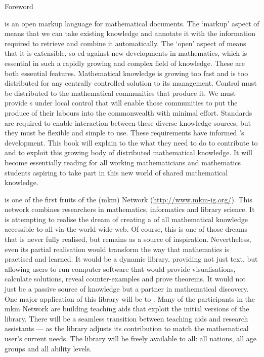 \begin{omgroup}{Foreword}
\begin{omtext}
{\omdoc} is an open markup language for mathematical documents. The `markup' aspect of
{\omdoc} means that we can take existing knowledge and annotate it with the information
required to retrieve and combine it automatically. The `open' aspect of {\omdoc} means
that it is extensible, so {ed} against new developments in
mathematics, which is essential in such a rapidly growing and complex field of
knowledge. These are both essential features. Mathematical knowledge is growing too fast
and is too distributed for any centrally controlled solution to its management. Control
must be distributed to the mathematical communities that produce it. We must provide
{s} under local control that will enable those communities
to put the produce of their labours into the commonwealth with minimal effort. Standards
are required to enable interaction between these diverse knowledge sources, but they must
be flexible and simple to use. These requirements have informed {\omdoc}'s
development. This book will explain to the
{} what they need to do to contribute to
and to exploit this growing body of distributed mathematical knowledge. It will become
essentially reading for all working mathematicians and mathematics students aspiring to
take part in this new world of shared mathematical knowledge.
\end{omtext}

\begin{omtext}
{\omdoc} is one of the first fruits of the {}
({\sc mkm}) Network (\url{http://www.mkm-ig.org/}). This network combines researchers in
mathematics, informatics and library science. It is attempting to realise the dream of
creating a {} of all mathematical
knowledge accessible to all via the world-wide-web. Of course, this is one of those dreams
that is never fully realised, but remains as a source of inspiration. Nevertheless, even
its partial realisation would transform the way that mathematics is practised and
learned. It would be a dynamic library, providing not just text, but allowing users to run
computer software that would provide visualisations, calculate solutions, reveal
counter-examples and prove theorems. It would not just be a passive source of knowledge
but a partner in mathematical discovery. One major application of this library will be to
{}. Many of the participants in the {\sc mkm} Network are building
teaching aids that exploit the initial versions of the library. There will be a seamless
transition between teaching aids and research assistants --- as the library adjusts its
contribution to match the mathematical user's current needs. The library will be freely
available to all: all nations, all age groups and all ability levels.
\end{omtext}


\end{omgroup}
